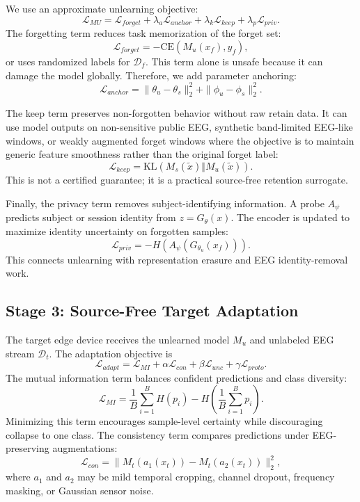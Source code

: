 \documentclass[10pt,twocolumn]{article}
\begin{document}
We use an approximate unlearning objective:
\begin{equation}
\mathcal{L}_{MU}
=
\mathcal{L}_{forget}
+\lambda_a\mathcal{L}_{anchor}
+\lambda_k\mathcal{L}_{keep}
+\lambda_p\mathcal{L}_{priv}.
\end{equation}
The forgetting term reduces task memorization of the forget set:
\begin{equation}
\mathcal{L}_{forget}=-\mathrm{CE}(M_u(x_f),y_f),
\end{equation}
or uses randomized labels for $\mathcal{D}_f$. This term alone is unsafe because it can damage the model globally. Therefore, we add parameter anchoring:
\begin{equation}
\mathcal{L}_{anchor}
=\|\theta_u-\theta_s\|_2^2+\|\phi_u-\phi_s\|_2^2.
\end{equation}

The keep term preserves non-forgotten behavior without raw retain data. It can use model outputs on non-sensitive public EEG, synthetic band-limited EEG-like windows, or weakly augmented forget windows where the objective is to maintain generic feature smoothness rather than the original forget label:
\begin{equation}
\mathcal{L}_{keep}
=
\mathrm{KL}(M_s(\tilde{x}) \Vert M_u(\tilde{x})).
\end{equation}
This is not a certified guarantee; it is a practical source-free retention surrogate.

Finally, the privacy term removes subject-identifying information. A probe $A_\psi$ predicts subject or session identity from $z=G_\theta(x)$. The encoder is updated to maximize identity uncertainty on forgotten samples:
\begin{equation}
\mathcal{L}_{priv}=-H(A_\psi(G_{\theta_u}(x_f))).
\end{equation}
This connects unlearning with representation erasure and EEG identity-removal work.

\subsection{Stage 3: Source-Free Target Adaptation}
The target edge device receives the unlearned model $M_u$ and unlabeled EEG stream $\mathcal{D}_t$. The adaptation objective is
\begin{equation}
\mathcal{L}_{adapt}
=
\mathcal{L}_{MI}
+\alpha\mathcal{L}_{con}
+\beta\mathcal{L}_{unc}
+\gamma\mathcal{L}_{proto}.
\end{equation}
The mutual information term balances confident predictions and class diversity:
\begin{equation}
\mathcal{L}_{MI}
=
\frac{1}{B}\sum_{i=1}^{B} H(p_i)-H\left(\frac{1}{B}\sum_{i=1}^{B}p_i\right).
\end{equation}
Minimizing this term encourages sample-level certainty while discouraging collapse to one class. The consistency term compares predictions under EEG-preserving augmentations:
\begin{equation}
\mathcal{L}_{con}
=
\|M_t(a_1(x_t))-M_t(a_2(x_t))\|_2^2,
\end{equation}
where $a_1$ and $a_2$ may be mild temporal cropping, channel dropout, frequency masking, or Gaussian sensor noise.
\end{document}
